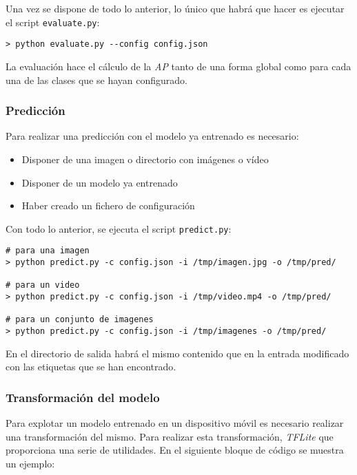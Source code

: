 Una vez se dispone de todo lo anterior, lo único que habrá que hacer es ejecutar el script \texttt{evaluate.py}:

\begin{lstlisting}[frame=single, basicstyle=\ttfamily\footnotesize, caption={Cómo evaluar un modelo entrenado}, captionpos=b]
> python evaluate.py --config config.json
\end{lstlisting}

La evaluación hace el cálculo de la \textit{AP} tanto de una forma global como para cada una de las clases que se hayan configurado.

\subsubsection*{Predicción}

Para realizar una predicción con el modelo ya entrenado es necesario:

\begin{itemize}
	\item Disponer de una imagen o directorio con imágenes o vídeo
	\item Disponer de un modelo ya entrenado
	\item Haber creado un fichero de configuración
\end{itemize}

Con todo lo anterior, se ejecuta el script \texttt{predict.py}:

\begin{lstlisting}[frame=single, basicstyle=\ttfamily\footnotesize, caption={Cómo hacer una predicción con un modelo entrenado}, captionpos=b]
# para una imagen
> python predict.py -c config.json -i /tmp/imagen.jpg -o /tmp/pred/

# para un video
> python predict.py -c config.json -i /tmp/video.mp4 -o /tmp/pred/

# para un conjunto de imagenes
> python predict.py -c config.json -i /tmp/imagenes -o /tmp/pred/
\end{lstlisting}

En el directorio de salida habrá el mismo contenido que en la entrada modificado con las etiquetas que se han encontrado.

\subsubsection*{Transformación del modelo}

Para explotar un modelo entrenado en un dispositivo móvil es necesario realizar una transformación del mismo. Para realizar esta transformación, \textit{TFLite} que proporciona una serie de utilidades. En el siguiente bloque de código se muestra un ejemplo:

